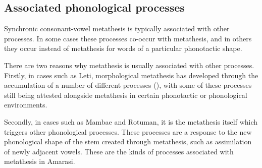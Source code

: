 \subsection{Associated phonological processes}
Synchronic consonant-vowel metathesis is typically
associated with other processes.
In some cases these processes co-occur with metathesis,
and in others they occur instead of metathesis
for words of a particular phonotactic shape.

There are two reasons why metathesis is usually associated with other processes.
Firstly, in cases such as Leti,
morphological metathesis has developed through the accumulation
of a number of different processes (),
with some of these processes still being attested alongside metathesis
in certain phonotactic or phonological environments.

Secondly, in cases such as Mambae and Rotuman,
it is the metathesis itself which triggers other phonological processes.
These processes are a response to the new phonological shape
of the stem created through metathesis, such as
assimilation of newly adjacent vowels.
These are the kinds of processes associated with metathesis in Amarasi.
